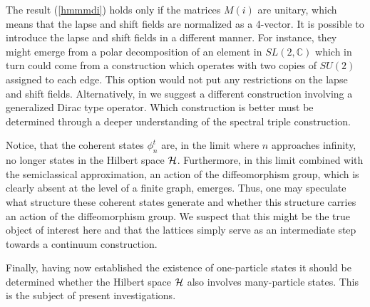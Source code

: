 \documentclass[12pt]{article}
\def\ch{{\cal H}}
\begin{document}
The result (\ref{hmmmdi}) holds only if the matrices $M(i)$ are unitary, which means that the lapse and shift fields are normalized as a 4-vector.  It is possible to introduce the lapse and shift fields in a different manner. For instance, they might emerge from a polar decomposition of an element in $SL(2,\mathbb{C})$ which in turn could come from a construction which operates with two copies of $SU(2)$ assigned to each edge. This option would not put any restrictions on the lapse and shift fields. Alternatively, in \cite{Aastrup:2009dy} we suggest a different construction involving a generalized Dirac type operator. Which construction is better must be determined through a deeper understanding of the spectral triple construction.




Notice, that the coherent states $\phi^t_n$ are, in the limit where $n$ approaches infinity, no longer states in the Hilbert space $\ch$. Furthermore, in this limit combined with the semiclassical approximation, an action of the diffeomorphism group, which is clearly absent at the level of a finite graph, emerges. Thus, one may speculate what structure these coherent states generate and whether this structure carries an action of the diffeomorphism group. We suspect that this might be the true object of interest here and that the lattices simply serve as an intermediate step towards a continuum construction.

Finally, having now established the existence of one-particle states it should be determined whether the Hilbert space $\ch$ also involves many-particle states. This is the subject of present investigations.













\end{document}
